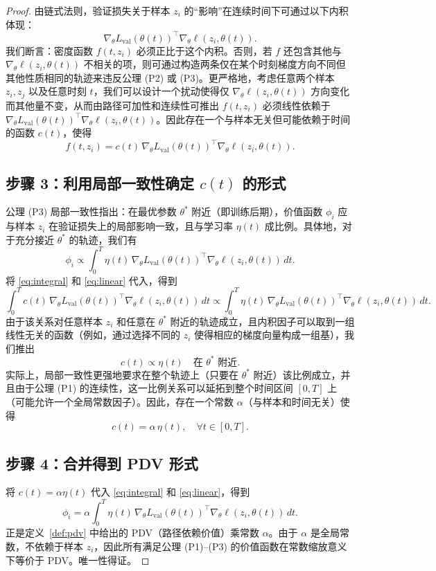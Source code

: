 \documentclass[12pt,a4paper]{ctexart}
\theoremstyle{definition}
\theoremstyle{plain}
\begin{document}
\begin{proof}
由链式法则，验证损失关于样本 $z_i$ 的“影响”在连续时间下可通过以下内积体现：
\[
\nabla_\theta L_{\text{val}}(\theta(t))^\top \nabla_\theta \ell(z_i, \theta(t)).
\]
我们断言：密度函数 $f(t,z_i)$ 必须正比于这个内积。否则，若 $f$ 还包含其他与 $\nabla_\theta \ell(z_i,\theta(t))$ 不相关的项，则可通过构造两条仅在某个时刻梯度方向不同但其他性质相同的轨迹来违反公理 (P2) 或 (P3)。更严格地，考虑任意两个样本 $z_i, z_j$ 以及任意时刻 $t$，我们可以设计一个扰动使得仅 $\nabla_\theta \ell(z_i,\theta(t))$ 方向变化而其他量不变，从而由路径可加性和连续性可推出 $f(t,z_i)$ 必须线性依赖于 $\nabla_\theta L_{\text{val}}(\theta(t))^\top \nabla_\theta \ell(z_i,\theta(t))$。因此存在一个与样本无关但可能依赖于时间的函数 $c(t)$，使得
\begin{equation}
f(t,z_i) = c(t) \, \nabla_\theta L_{\text{val}}(\theta(t))^\top \nabla_\theta \ell(z_i, \theta(t)).
\label{eq:linear}
\end{equation}

\subsection*{步骤 3：利用局部一致性确定 $c(t)$ 的形式}
公理 (P3) 局部一致性指出：在最优参数 $\theta^*$ 附近（即训练后期），价值函数 $\phi_i$ 应与样本 $z_i$ 在验证损失上的局部影响一致，且与学习率 $\eta(t)$ 成比例。具体地，对于充分接近 $\theta^*$ 的轨迹，我们有
\[
\phi_i \propto \int_0^T \eta(t) \, \nabla_\theta L_{\text{val}}(\theta(t))^\top \nabla_\theta \ell(z_i, \theta(t)) \, dt.
\]
将 \eqref{eq:integral} 和 \eqref{eq:linear} 代入，得到
\[
\int_0^T c(t) \, \nabla_\theta L_{\text{val}}(\theta(t))^\top \nabla_\theta \ell(z_i, \theta(t)) \, dt
\propto \int_0^T \eta(t) \, \nabla_\theta L_{\text{val}}(\theta(t))^\top \nabla_\theta \ell(z_i, \theta(t)) \, dt.
\]
由于该关系对任意样本 $z_i$ 和任意在 $\theta^*$ 附近的轨迹成立，且内积因子可以取到一组线性无关的函数（例如，通过选择不同的 $z_i$ 使得相应的梯度向量构成一组基），我们推出
\[
c(t) \propto \eta(t) \quad \text{在 } \theta^* \text{ 附近}.
\]
实际上，局部一致性更强地要求在整个轨迹上（只要在 $\theta^*$ 附近）该比例成立，并且由于公理 (P1) 的连续性，这一比例关系可以延拓到整个时间区间 $[0,T]$ 上（可能允许一个全局常数因子）。因此，存在一个常数 $\alpha$（与样本和时间无关）使得
\[
c(t) = \alpha \, \eta(t), \quad \forall t \in [0,T].
\]

\subsection*{步骤 4：合并得到 PDV 形式}
将 $c(t) = \alpha \eta(t)$ 代入 \eqref{eq:integral} 和 \eqref{eq:linear}，得到
\[
\phi_i = \alpha \int_0^T \eta(t) \, \nabla_\theta L_{\text{val}}(\theta(t))^\top \nabla_\theta \ell(z_i, \theta(t)) \, dt.
\]
正是定义~\ref{def:pdv} 中给出的 PDV（路径依赖价值）乘常数 $\alpha$。由于 $\alpha$ 是全局常数，不依赖于样本 $z_i$，因此所有满足公理 (P1)--(P3) 的价值函数在常数缩放意义下等价于 PDV。唯一性得证。
\end{proof}
\end{document}
